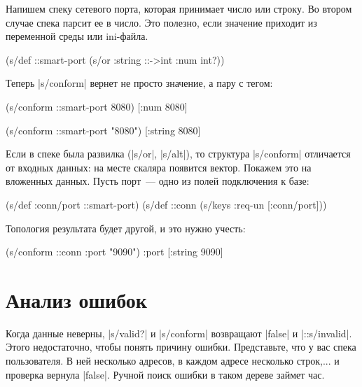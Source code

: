 Напишем спеку сетевого порта, которая принимает число или строку. Во втором
случае спека парсит ее в число. Это полезно, если значение приходит из
переменной среды или ini-файла.

\begin{english}
  \begin{clojure}
(s/def ::smart-port
  (s/or :string ::->int :num int?))
  \end{clojure}
\end{english}

Теперь \spverb|s/conform| вернет не просто значение, а пару с тегом:

\begin{english}
  \begin{clojure}
(s/conform ::smart-port 8080)
[:num 8080]

(s/conform ::smart-port "8080")
[:string 8080]
  \end{clojure}
\end{english}

Если в спеке была развилка (\spverb|s/or|, \spverb|s/alt|), то структура
\spverb|s/conform| отличается от входных данных: на месте скаляра появится
вектор. Покажем это на вложенных данных. Пусть порт~--- одно из полей
подключения к базе:

\begin{english}
  \begin{clojure}
(s/def :conn/port ::smart-port)
(s/def ::conn
  (s/keys :req-un [:conn/port]))
  \end{clojure}
\end{english}

Топология результата будет другой, и это нужно учесть:

\begin{english}
  \begin{clojure}
(s/conform ::conn {:port "9090"})
{:port [:string 9090]}
  \end{clojure}
\end{english}


\section{Анализ ошибок}

Когда данные неверны, \spverb|s/valid?| и \spverb|s/conform| возвращают
\spverb|false| и \spverb|::s/invalid|. Этого недостаточно, чтобы понять причину
ошибки. Представьте, что у вас спека пользователя. В ней несколько адресов, в
каждом адресе несколько строк,... и проверка вернула \spverb|false|. Ручной
поиск ошибки в таком дереве займет час.

